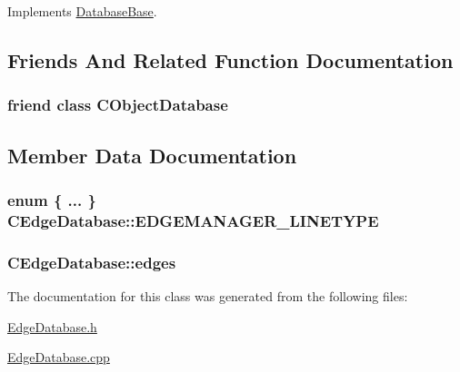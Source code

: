 Implements \hyperlink{class_database_base_aa59101d74cd7d347a62d238495bc9b0c}{Database\+Base}.



\subsection{Friends And Related Function Documentation}
\hypertarget{class_c_edge_database_a8451ee9e81bc51a04afb10dc6ee7e07e}{}
\subsubsection[{C\+Object\+Database}]{\setlength{\rightskip}{0pt plus 5cm}friend class {\bf C\+Object\+Database}\hspace{0.3cm}{\ttfamily [friend]}}\label{class_c_edge_database_a8451ee9e81bc51a04afb10dc6ee7e07e}


\subsection{Member Data Documentation}
\hypertarget{class_c_edge_database_a7eacf69de5cad8d2c2452c6c84c1e22a}{}
\subsubsection[{E\+D\+G\+E\+M\+A\+N\+A\+G\+E\+R\+\_\+\+L\+I\+N\+E\+T\+Y\+P\+E}]{\setlength{\rightskip}{0pt plus 5cm}enum \{ ... \}   C\+Edge\+Database\+::\+E\+D\+G\+E\+M\+A\+N\+A\+G\+E\+R\+\_\+\+L\+I\+N\+E\+T\+Y\+P\+E}\label{class_c_edge_database_a7eacf69de5cad8d2c2452c6c84c1e22a}
\hypertarget{class_c_edge_database_a2a1689567a1355c92bb6bfd04a97a7d1}{}
\subsubsection[{edges}]{ C\+Edge\+Database\+::edges}\label{class_c_edge_database_a2a1689567a1355c92bb6bfd04a97a7d1}


The documentation for this class was generated from the following files\+:\begin{DoxyCompactItemize}
\item 
\hyperlink{_edge_database_8h}{Edge\+Database.\+h}\item 
\hyperlink{_edge_database_8cpp}{Edge\+Database.\+cpp}\end{DoxyCompactItemize}
